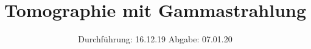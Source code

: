

\subject{V14}
\title{Tomographie mit Gamma­strahlung}
\date{
  Durchführung: 16.12.19
  \hspace{3em}
  Abgabe: 07.01.20
}



\maketitle
\thispagestyle{empty}
\tableofcontents
\newpage




%



\newpage
\printbibliography


